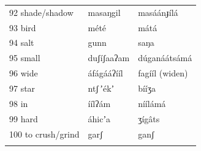 \documentclass[output=paper]{langsci/langscibook}
\begin{document}
\begin{longtable}{p{}  p{} p{}}
92 shade/shadow & masaŋgil & masáánɟílá \\

93 bird & mété & mátá \\

94 salt & gunn & saŋa \\

95 small & duʃíʃaaʔam & d\'{u}ganáátsámá
\\

96 wide & áfágááʔííl & fagííl (widen) \\

97 star & ntʃ\,ʼékʼ & bííʒa \\

98 in & íílʔám & níílámá \\

99 hard & áhicʼa & ʒígâts \\

100 to crush/grind & garʃ & ganʃ \\
\lspbottomrule
\end{longtable}


\printbibliography[heading=subbibliography,notkeyword=this]
\end{document}
